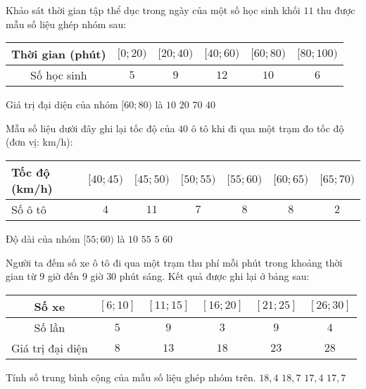 \begin{ex}%
 Khảo sát thời gian tập thể dục trong ngày của một số học sinh khối $11$ thu được mẫu số liệu ghép nhóm sau:
 \begin{center}
 \begin{tabular}{|c|c|c|c|c|c|}
 \hline
 Thời gian (phút) & $[0; 20)$ & $[20; 40)$ & $[40; 60)$ & $[60; 80)$ & $[80; 100)$\\
 \hline
 Số học sinh & $5$ & $9$ & $12$ & $10$ & $6$ \\
 \hline
 \end{tabular}
 \end{center}
 Giá trị đại diện của nhóm $[60; 80)$ là
 \choice
 {$10$}
 {$20$}
 {\True $70$}
 {$40$}
 \loigiai{
 Giá trị đại diện của nhóm $[60; 80)$ là $\dfrac{60+80}{2}=70$.
 }
\end{ex}

\begin{ex}%
 Mẫu số liệu dưới đây ghi lại tốc độ của $40$ ô tô khi đi qua một trạm đo tốc độ (đơn vị: km/h):
 \begin{center}
 \begin{tabular}{|l|c|c|c|c|c|c|}
 \hline
 Tốc độ (km/h) & $[40; 45)$ & $[45; 50)$ & $[50; 55)$ & $[55; 60)$ & $[60; 65)$ & $[65; 70)$\\
 \hline
 Số ô tô & $4$ & $11$ & $7$ & $8$ & $8$ & $2$ \\
 \hline
 \end{tabular}
 \end{center}
 Độ dài của nhóm $[55; 60)$ là
 \choice
 {$10$}
 {$55$}
 {\True $5$}
 {$60$}
 \loigiai{
 Độ dài của nhóm $[55; 60)$ là $60-55=5$.
 }
\end{ex}

\begin{ex}%
 Người ta đếm số xe ô tô đi qua một trạm thu phí mỗi phút trong khoảng thời gian từ $9$ giờ đến $9$ giờ $30$ phút sáng. Kết quả được ghi lại ở bảng sau:
 \begin{center}
 \begin{tabular}{|c|c|c|c|c|c|}
 \hline
 Số xe & $[6; 10]$ & $[11; 15]$ & $[16; 20]$ & $[21; 25]$ & $[26; 30]$\\
 \hline
 Số lần & $5$ & $9$ & $3$ & $9$ & $4$ \\
 \hline
 Giá trị đại diện & $8$ & $13$ & $18$ & $23$ & $28$ \\
 \hline
 \end{tabular}
 \end{center}
 Tính số trung bình cộng của mẫu số liệu ghép nhóm trên.
 \choice
 {$18{,}4$}
 {$18{,}7$}
 {$17{,}4$}
 {\True $17{,}7$}
\end{ex}

